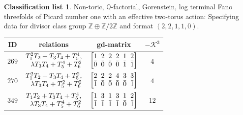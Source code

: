 \documentclass[pdftex]{sigma}%
\theoremstyle{definition}
\newtheorem{class-list}[thm]{Classification list}
\def\ZZ{{\mathbb Z}}
\def\QQ{{\mathbb Q}}
\numberwithin{equation}{section}
\begin{document}
\begin{class-list}
Non-toric, $\QQ$-factorial, Gorenstein, log terminal Fano
threefolds of Picard number one with an effective two-torus action:
Specifying data for divisor class group $\ZZ\oplus \ZZ/2\ZZ$ and
format $(2,2,1,1,0)$.
\begin{table}[h!]\centering\setlength{\tabcolsep}{6.5pt}
\renewcommand{\arraystretch}{1.3}\small\tabulinesep=1mm
\begin{tabu}{c|c|c|c}
\hline
ID&relations&gd-matrix&$-\mathcal{K}^3$
\\
\hline
${269}$&
$\setlength{\arraycolsep}{1pt}\begin{array}{r}{T_{1}^{2}T_{2}+T_{3}T_{4}+T_{5}^{4}},\\ {\lambda T_{3}T_{4}+T_{5}^{4}+T_{6}^{2}}\end{array}$
&$\arraycolsep=1mm\begin{bmatrix}{1} & {2} & {2} & {2} & {1} & {2} \\ {\bar{0}} & {\bar{0}} & {\bar{0}} & {\bar{0}} & {\bar{1}} & {\bar{1}}\end{bmatrix}$&${4}$
\\
\hline
${270}$&
$\setlength{\arraycolsep}{1pt}\begin{array}{r}{T_{1}^{2}T_{2}+T_{3}T_{4}+T_{5}^{2}},\\ {\lambda T_{3}T_{4}+T_{5}^{2}+T_{6}^{2}}\end{array}$
&$\arraycolsep=1mm\begin{bmatrix}{2} & {2} & {2} & {4} & {3} & {3} \\ {\bar{1}} & {\bar{0}} & {\bar{0}} & {\bar{0}} & {\bar{0}} & {\bar{1}}\end{bmatrix}$&${4}$
\\
\hline
${349}$&
$\setlength{\arraycolsep}{1pt}\begin{array}{r}{T_{1}T_{2}+T_{3}T_{4}+T_{5}^{4}},\\ {\lambda T_{3}T_{4}+T_{5}^{4}+T_{6}^{2}}\end{array}$
&$\arraycolsep=1mm\begin{bmatrix}{1} & {3} & {1} & {3} & {1} & {2} \\ {\bar{1}} & {\bar{1}} & {\bar{1}} & {\bar{1}} & {\bar{0}} & {\bar{1}}\end{bmatrix}$&${12}$
\\
\hline
\end{tabu}%
\end{table}
\end{class-list}
\end{document}
